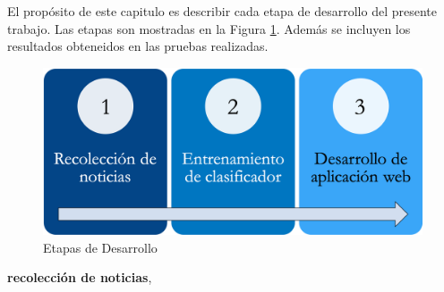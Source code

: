 \ \\\\

El propósito de este capitulo es describir cada etapa de desarrollo del presente trabajo. Las etapas son mostradas en la Figura \ref{fig:cp5:etapas}. Además se incluyen los resultados obteneidos en las pruebas realizadas. 

\begin{figure}[h]
\centering
\includegraphics[scale=.35]{imagenes/Capitulo5/Etapas.png}
\caption{Etapas de Desarrollo}
\label{fig:cp5:etapas}
\end{figure}

\textbf{recolección de noticias},  


\newpage

\newpage



